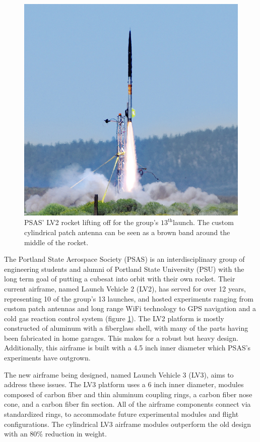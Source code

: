 \documentclass{aiaa-tc}%
\newcommand{\weightReduction}{80\%}
\begin{document}
\begin{figure}
\centering
\includegraphics[width=\linewidth]{../img/L12-cropped.png}
\caption{PSAS' LV2 rocket lifting off for the group's $13^\text{th}$launch. The custom cylindrical patch antenna can be seen as a brown band around the middle of the rocket.}
\label{fig:L-12}
\end{figure}

The Portland State Aerospace Society (PSAS) is an interdisciplinary group of engineering students and alumni of Portland State University (PSU) with the long term goal of putting a cubesat into orbit with their own rocket. 
Their current airframe, named Launch Vehicle 2 (LV2), has served for over 12 years, representing 10 of the group's 13 launches, and hosted experiments ranging from custom patch antennas and long range WiFi technology to GPS navigation and a cold gas reaction control system (figure \ref{fig:L-12}). The LV2 platform is mostly constructed of aluminum with a fiberglass shell, with many of the parts having been fabricated in home garages. This makes for a robust but heavy design. Additionally, this airframe is built with a 4.5 inch inner diameter which PSAS's experiments have outgrown. 

The new airframe being designed, named Launch Vehicle 3 (LV3), aims to address these issues. The LV3 platform uses a 6 inch inner diameter, modules composed of carbon fiber and thin aluminum coupling rings, a carbon fiber nose cone, and a carbon fiber fin section. All of the airframe components connect via standardized rings, to accommodate future experimental modules and flight configurations.
The cylindrical LV3 airframe modules outperform the old design with an \weightReduction{} reduction in weight.
\end{document}
